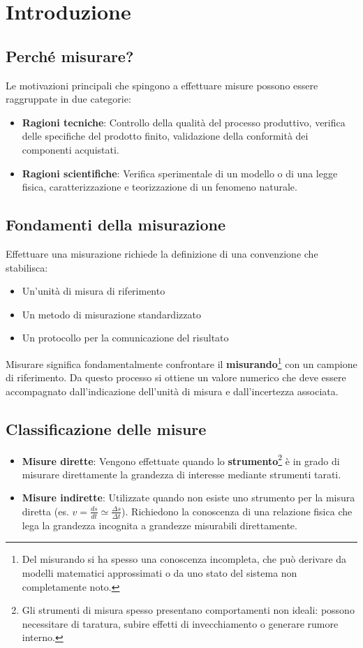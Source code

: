\section{Introduzione}
\subsection{Perché misurare?}
Le motivazioni principali che spingono a effettuare misure possono essere raggruppate in due categorie:
\begin{itemize}
    \item \textbf{Ragioni tecniche}: Controllo della qualità del processo produttivo, verifica delle specifiche del prodotto finito, validazione della conformità dei componenti acquistati.
    \item \textbf{Ragioni scientifiche}: Verifica sperimentale di un modello o di una legge fisica, caratterizzazione e teorizzazione di un fenomeno naturale.
\end{itemize}

\subsection{Fondamenti della misurazione}
Effettuare una misurazione richiede la definizione di una convenzione che stabilisca:
\begin{itemize}
    \item Un'unità di misura di riferimento
    \item Un metodo di misurazione standardizzato
    \item Un protocollo per la comunicazione del risultato
\end{itemize}

Misurare significa fondamentalmente confrontare il \textbf{misurando}\footnote{Del misurando si ha spesso una conoscenza incompleta, che può derivare da modelli matematici approssimati o da uno stato del sistema non completamente noto.} con un campione di riferimento. Da questo processo si ottiene un valore numerico che deve essere accompagnato dall'indicazione dell'unità di misura e dall'incertezza associata.

\subsection{Classificazione delle misure}
\begin{itemize}
    \item \textbf{Misure dirette}: Vengono effettuate quando lo \textbf{strumento}\footnote{Gli strumenti di misura spesso presentano comportamenti non ideali: possono necessitare di taratura, subire effetti di invecchiamento o generare rumore interno.} è in grado di misurare direttamente la grandezza di interesse mediante strumenti tarati.
    \item \textbf{Misure indirette}: Utilizzate quando non esiste uno strumento per la misura diretta (es. $v = \frac{ds}{dt} \simeq \frac{\Delta s}{\Delta t}$). Richiedono la conoscenza di una relazione fisica che lega la grandezza incognita a grandezze misurabili direttamente.
\end{itemize}


